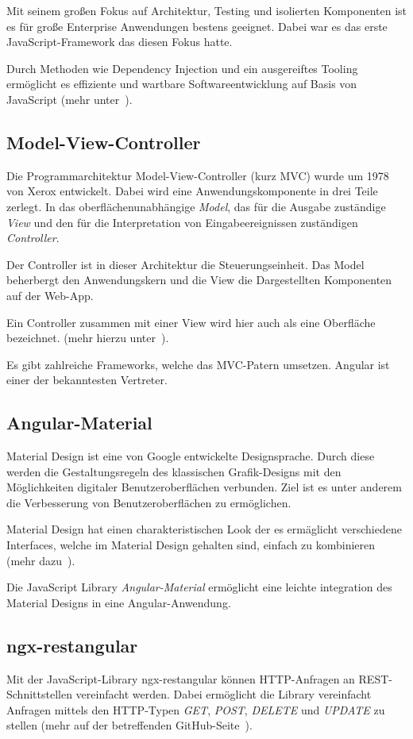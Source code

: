 Mit seinem großen Fokus auf Architektur, Testing und isolierten Komponenten ist es für große Enterprise Anwendungen
bestens geeignet. Dabei war es das erste JavaScript-Framework das diesen Fokus hatte.

Durch Methoden wie Dependency Injection und ein ausgereiftes Tooling ermöglicht es effiziente und wartbare
Softwareentwicklung auf Basis von JavaScript (mehr unter~\cite{book_grundlagen_angular}).

\subsection{Model-View-Controller}
Die Programmarchitektur Model-View-Controller (kurz MVC) wurde um 1978 von Xerox entwickelt. Dabei wird eine
Anwendungskomponente in drei Teile zerlegt. In das oberflächenunabhängige \textit{Model}, das für die
Ausgabe zuständige \textit{View} und den für die Interpretation von Eingabeereignissen zuständigen \textit{Controller}.

Der Controller ist in dieser Architektur die Steuerungseinheit. Das Model beherbergt den Anwendungskern und die View
die Dargestellten Komponenten auf der Web-App.

Ein Controller zusammen mit einer View wird hier auch als eine Oberfläche bezeichnet. (mehr hierzu
unter~\cite{book_grundlagen_mvc}).

Es gibt zahlreiche Frameworks, welche das MVC-Patern umsetzen. Angular ist einer der bekanntesten Vertreter.

\subsection{Angular-Material}
Material Design ist eine von Google entwickelte Designsprache. Durch diese werden die Gestaltungsregeln des klassischen
Grafik-Designs mit den Möglichkeiten digitaler Benutzeroberflächen verbunden. Ziel ist es unter anderem die Verbesserung
von Benutzeroberflächen zu ermöglichen.

Material Design hat einen charakteristischen Look der es ermäglicht verschiedene Interfaces, welche im Material Design
gehalten sind, einfach zu kombinieren (mehr dazu~\cite{online_grundlagen_materialdesign}).

Die JavaScript Library \textit{Angular-Material} ermöglicht eine leichte integration des Material Designs in eine
Angular-Anwendung.

\subsection{ngx-restangular}
Mit der JavaScript-Library ngx-restangular können HTTP-Anfragen an REST-Schnitt\-stellen vereinfacht werden. Dabei
ermöglicht die Library vereinfacht Anfragen mittels den HTTP-Typen \textit{GET}, \textit{POST}, \textit{DELETE} und
\textit{UPDATE} zu stellen (mehr auf der betreffenden GitHub-Seite~\cite{online_grundlagen_restangular}).

